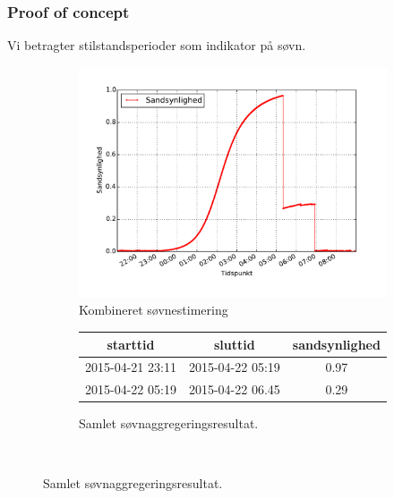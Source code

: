 \begin{frame}
\frametitle{Proof of concept}
Vi betragter stilstandsperioder som indikator på søvn.

\begin{figure}
	\begin{minipage}{\linewidth}
		\begin{minipage}{\linewidth}
		
		\begin{subfigure}{\linewidth}
			\centering
			\includegraphics[scale=0.2, trim = 1cm 1cm 1cm 1cm, clip]{../Report/grafik/kombi_figur/combined-sleep-estimate-plot}
			\caption{Kombineret søvnestimering}\label{fig:sleepcalcombine}
		\end{subfigure}
		\end{minipage}
		\begin{minipage}{\linewidth}
		\begin{subfigure}{\linewidth}
			\centering
			\begin{tabular}{|c|c|c|}
			\hline starttid & sluttid & sandsynlighed \\ 
			\hline 2015-04-21 23:11 & 2015-04-22 05:19 & 0.97 \\ 
			\hline 2015-04-22 05:19 & 2015-04-22 06.45 & 0.29 \\ 
			\hline 
			\end{tabular}
			\caption{Samlet søvnaggregeringsresultat.}\label{fig:finalagg}
		\end{subfigure}
		\end{minipage}
	\end{minipage}\\[1ex]%
\end{figure}
\end{frame}

